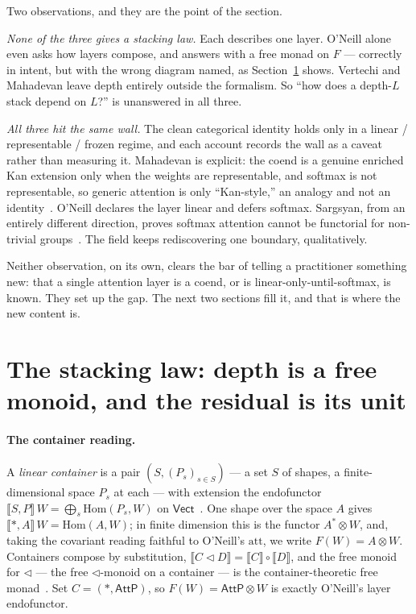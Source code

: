 \documentclass[11pt]{article}
\newcommand{\Vect}{\mathsf{Vect}}
\newcommand{\Hom}{\mathrm{Hom}}
\newcommand{\ext}[1]{\llbracket #1 \rrbracket}
\newcommand{\AttP}{\mathsf{AttP}}
\theoremstyle{plain}
\theoremstyle{definition}
\begin{document}
Two observations, and they are the point of the section.

\emph{None of the three gives a stacking law.} Each describes one layer. O'Neill alone even asks how
layers compose, and answers with a free monad on $F$ --- correctly in intent, but with the wrong
diagram named, as Section~\ref{sec:stacking} shows. Vertechi and Mahadevan leave depth entirely
outside the formalism. So ``how does a depth-$L$ stack depend on $L$?'' is unanswered in all three.

\emph{All three hit the same wall.} The clean categorical identity holds only in a linear /
representable / frozen regime, and each account records the wall as a caveat rather than measuring it.
Mahadevan is explicit: the coend is a genuine enriched Kan extension only when the weights are
representable, and softmax is not representable, so generic attention is only ``Kan-style,'' an
analogy and not an identity~\cite[\S10.6]{ket}. O'Neill declares the layer linear and defers softmax.
Sargsyan, from an entirely different direction, proves softmax attention cannot be functorial for
non-trivial groups~\cite{sargsyan}. The field keeps rediscovering one boundary, qualitatively.

Neither observation, on its own, clears the bar of telling a practitioner something new: that a single
attention layer is a coend, or is linear-only-until-softmax, is known. They set up the gap. The next two
sections fill it, and that is where the new content is.

\section{The stacking law: depth is a free monoid, and the residual is its unit}\label{sec:stacking}

\paragraph{The container reading.} A \emph{linear container} is a pair $(S,(P_s)_{s\in S})$ --- a set
$S$ of shapes, a finite-dimensional space $P_s$ at each --- with extension the endofunctor
$\ext{S,P}\,W=\bigoplus_s \Hom(P_s,W)$ on $\Vect$~\cite{vcont}. One shape over the space $A$ gives
$\ext{\ast,A}\,W=\Hom(A,W)$; in finite dimension this is the functor $A^{*}\!\otimes W$, and, taking the
covariant reading faithful to O'Neill's $\mathrm{att}$, we write $F(W)=A\otimes W$. Containers compose by
substitution, $\ext{C\lhd D}=\ext{C}\circ\ext{D}$, and the free monoid for $\lhd$ --- the free
$\lhd$-monoid on a container --- is the container-theoretic free monad~\cite{djn}. Set $C=(\ast,\AttP)$,
so $F(W)=\AttP\otimes W$ is exactly O'Neill's layer endofunctor.
\end{document}
